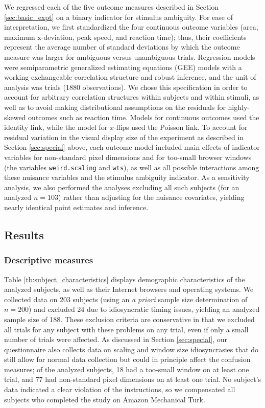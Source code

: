\documentclass[]{article}
\begin{document}
We regressed each of the five outcome measures described in Section
\ref{sec:basic_expt} on a binary indicator for stimulus ambiguity. For
ease of interpretation, we first standardized the four continuous
outcome variables (area, maximum x-deviation, peak speed, and reaction
time); thus, their coefficients represent the average number of standard
deviations by which the outcome measure was larger for ambiguous versus
unambiguous trials. Regression models were semiparametric generalized
estimating equations (GEE) models with a working exchangeable
correlation structure and robust inference, and the unit of analysis was
trials (1880 observations). We chose this specification in order to
account for arbitrary correlation structures within subjects and within
stimuli, as well as to avoid making distributional assumptions on the
residuals for highly-skewed outcomes such as reaction time. Models for
continuous outcomes used the identity link, while the model for
\(x\)-flips used the Poisson link. To account for residual variation in
the visual display size of the experiment as described in Section
\ref{sec:special} above, each outcome model included main effects of
indicator variables for non-standard pixel dimensions and for too-small
browser windows (the variables \texttt{weird.scaling} and \texttt{wts}),
as well as all possible interactions among these nuisance variables and
the stimulus ambiguity indicator. As a sensitivity analysis, we also
performed the analyses excluding all such subjects (for an analyzed
\(n=103\)) rather than adjusting for the nuisance covariates, yielding
nearly identical point estimates and inference.

\subsection{Results}

\subsubsection{Descriptive measures}

Table \ref{tb:subject_characteristics} displays demographic
characteristics of the analyzed subjects, as well as their Internet
browsers and operating systems. We collected data on 203 subjects (using
an \emph{a priori} sample size determination of \(n=200\)) and excluded
24 due to idiosyncratic timing issues, yielding an analyzed sample size
of 188. These exclusion criteria are conservative in that we excluded
all trials for any subject with these problems on any trial, even if
only a small number of trials were affected. As discussed in Section
\ref{sec:special}, our questionnaire also collects data on scaling and
window size idiosyncrasies that do still allow for normal data
collection but could in principle affect the confusion measures; of the
analyzed subjects, 18 had a too-small window on at least one trial, and
77 had non-standard pixel dimensions on at least one trial. No subject's
data indicated a clear violation of the instructions, so we compensated
all subjects who completed the study on Amazon Mechanical Turk.
\end{document}

